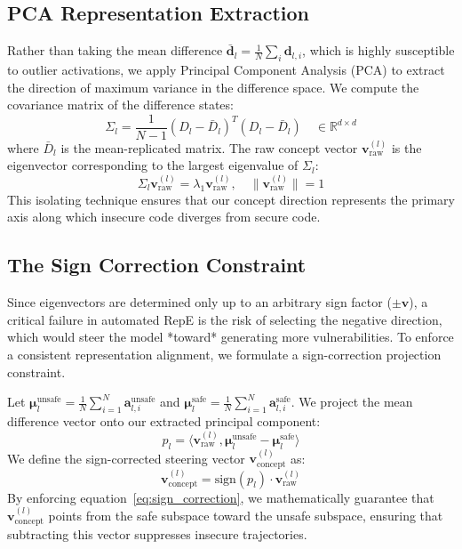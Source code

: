 \documentclass[journal, onecolumn]{IEEEtran}
\begin{document}
\subsection{PCA Representation Extraction}
Rather than taking the mean difference $\bar{\bm{d}}_l = \frac{1}{N}\sum_i \bm{d}_{l, i}$, which is highly susceptible to outlier activations, we apply Principal Component Analysis (PCA) to extract the direction of maximum variance in the difference space. We compute the covariance matrix of the difference states:
\begin{equation}
    \Sigma_l = \frac{1}{N-1} (D_l - \bar{D}_l)^T (D_l - \bar{D}_l) \quad \in \mathbb{R}^{d \times d}
\end{equation}
where $\bar{D}_l$ is the mean-replicated matrix. The raw concept vector $\bm{v}_{\text{raw}}^{(l)}$ is the eigenvector corresponding to the largest eigenvalue of $\Sigma_l$:
\begin{equation}
    \Sigma_l \bm{v}_{\text{raw}}^{(l)} = \lambda_1 \bm{v}_{\text{raw}}^{(l)}, \quad \|\bm{v}_{\text{raw}}^{(l)}\| = 1
\end{equation}
This isolating technique ensures that our concept direction represents the primary axis along which insecure code diverges from secure code.

\subsection{The Sign Correction Constraint}
Since eigenvectors are determined only up to an arbitrary sign factor ($\pm \bm{v}$), a critical failure in automated RepE is the risk of selecting the negative direction, which would steer the model *toward* generating more vulnerabilities. To enforce a consistent representation alignment, we formulate a sign-correction projection constraint.

Let $\bm{\mu}_l^{\text{unsafe}} = \frac{1}{N}\sum_{i=1}^N \bm{a}_{l, i}^{\text{unsafe}}$ and $\bm{\mu}_l^{\text{safe}} = \frac{1}{N}\sum_{i=1}^N \bm{a}_{l, i}^{\text{safe}}$. We project the mean difference vector onto our extracted principal component:
\begin{equation}
    p_l = \langle \bm{v}_{\text{raw}}^{(l)}, \bm{\mu}_l^{\text{unsafe}} - \bm{\mu}_l^{\text{safe}} \rangle
\end{equation}
We define the sign-corrected steering vector $\bm{v}_{\text{concept}}^{(l)}$ as:
\begin{equation}
    \bm{v}_{\text{concept}}^{(l)} = \text{sign}(p_l) \cdot \bm{v}_{\text{raw}}^{(l)}
    \label{eq:sign_correction}
\end{equation}
By enforcing equation~\eqref{eq:sign_correction}, we mathematically guarantee that $\bm{v}_{\text{concept}}^{(l)}$ points from the safe subspace toward the unsafe subspace, ensuring that subtracting this vector suppresses insecure trajectories.
\end{document}
